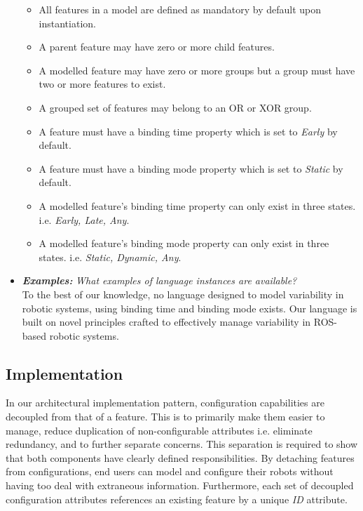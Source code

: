 \documentclass[conference]{IEEEtran}
\begin{document}
\begin{itemize}
\begin{itemize}
            \item All features in a model are defined as mandatory by default upon instantiation.
            \item A parent feature may have zero or more child features.
            \item A modelled feature may have zero or more groups but a group must have two or more features to exist.
            \item A grouped set of features may belong to an OR or XOR group.
            \item A feature must have a binding time property which is set to \textit{Early} by default.
            \item A feature must have a binding mode property which is set to \textit{Static} by default.
            \item A modelled feature's binding time property can only exist in three states. i.e. \textit{Early, Late, Any}.
            \item A modelled feature's binding mode property can only exist in three states. i.e. \textit{Static, Dynamic, Any}.
        \end{itemize}
        \item \textit{\textbf{Examples:}} \textit{What examples of language instances are available?}\\
        To the best of our knowledge, no language designed to model variability in robotic systems, using binding time and binding mode exists. Our language is built on novel principles crafted to effectively manage variability in ROS-based robotic systems.
    \end{itemize}
    
\subsection{Implementation}
In our architectural implementation pattern, configuration capabilities are decoupled from that of a feature. This is to primarily make them easier to manage, reduce duplication of non-configurable attributes i.e. eliminate redundancy, and to further separate concerns. This separation is required to show that both components have clearly defined responsibilities. By detaching features from configurations, end users can model and configure their robots without having too deal with extraneous information. Furthermore, each set of decoupled configuration attributes references an existing feature by a unique \textit{ID} attribute.
\end{document}
